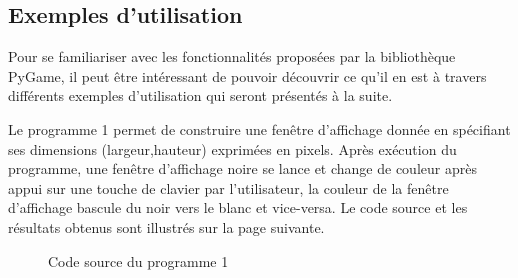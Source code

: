 \documentclass[a4paper]{article}
\begin{document}
\subsection{Exemples d'utilisation}

Pour se familiariser avec les fonctionnalités proposées par la bibliothèque PyGame, il peut être intéressant de pouvoir découvrir ce qu'il en est à travers différents exemples d'utilisation qui seront présentés à la suite.

\vspace{0.5cm}



Le programme 1 permet de construire une fenêtre d'affichage donnée en spécifiant ses dimensions (largeur,hauteur) exprimées en pixels. Après exécution du programme, une fenêtre d'affichage noire se lance et change de couleur après appui sur une touche de clavier par l'utilisateur, la couleur de la fenêtre d'affichage bascule du noir vers le blanc et vice-versa.
Le code source et les résultats obtenus sont illustrés sur la page suivante.

\newpage

\begin{figure}[h!]
\centering
{}
\caption{Code source du programme 1}
\end{figure}
\end{document}
